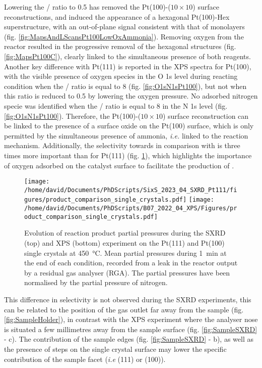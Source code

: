 Lowering the / ratio to \num{0.5} has removed the Pt(100)-($10\times10$) surface reconstructions, and induced the appearance of a hexagonal Pt(100)-Hex superstructure, with an out-of-plane signal consistent with that of monolayers (fig. \ref{fig:MapsAndLScansPt100LowOxAmmonia}).
Removing oxygen from the reactor resulted in the progressive removal of the hexagonal structures (fig. \ref{fig:MapsPt100C}), clearly linked to the simultaneous presence of both reagents.
Another key difference with Pt(111) is reported in the XPS spectra for Pt(100), with the visible presence of oxygen species in the O 1s level during reacting condition when the / ratio is equal to \num{8} (fig. \ref{fig:O1sN1sPt100}), but not when this ratio is reduced to \num{0.5} by lowering the oxygen pressure.
No adsorbed nitrogen specie was identified when the / ratio is equal to \num{8} in the N 1s level  (fig. \ref{fig:O1sN1sPt100}).
Therefore, the Pt(100)-($10\times10$) surface reconstruction can be linked to the presence of a surface oxide on the Pt(100) surface, which is only permitted by the simultaneous presence of ammonia, \textit{i.e.} linked to the reaction mechanism.
Additionally, the selectivity towards  in comparison with  is three times more important than for Pt(111) (fig. \ref{fig:RGA450Pt111AndPt100}), which highlights the importance of oxygen adsorbed on the catalyst surface to facilitate the production of .

\begin{figure}[!htb]
    \centering
    \texttt{[image: /home/david/Documents/PhDScripts/SixS\_2023\_04\_SXRD\_Pt111/figures/product\_comparison\_single\_crystals.pdf]}
    \texttt{[image: /home/david/Documents/PhDScripts/B07\_2022\_04\_XPS/Figures/product\_comparison\_single\_crystals.pdf]}
    \caption{
        Evolution of reaction product partial pressures during the SXRD (top) and XPS (bottom) experiment on the Pt(111) and Pt(100) single crystals at \qty{450}{\degreeCelsius}.
        Mean partial pressures during \qty{1}{\minute} at the end of each condition, recorded from a leak in the reactor output by a residual gas analyser (RGA).
        The partial pressures have been normalised by the partial pressure of nitrogen.
    }
    \label{fig:RGA450Pt111AndPt100}
\end{figure}

This difference in selectivity is not observed during the SXRD experiments, this can be related to the position of the gas outlet far away from the sample (fig. \ref{fig:SampleHolder}), in contrast with the XPS experiment where the analyser nose is situated a few millimetres away from the sample surface (fig. \ref{fig:SampleSXRD} - c).
The contribution of the sample edges (fig. \ref{fig:SampleSXRD} - b), as well as the presence of steps on the single crystal surface may lower the specific contribution of the sample facet (\textit{i.e} (111) or (100)).

